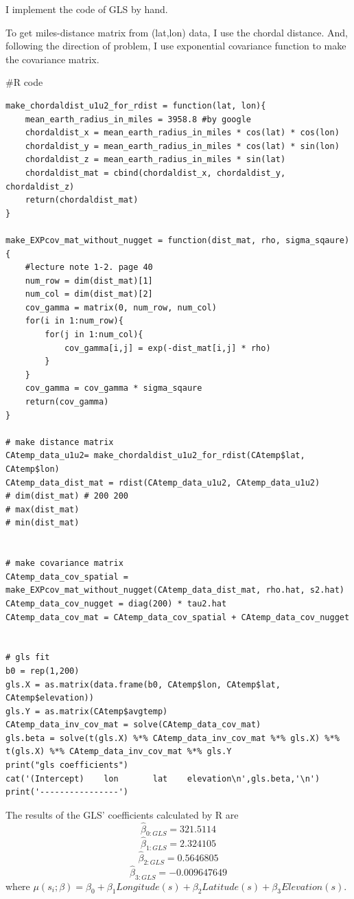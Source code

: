 \documentclass{article}
\newenvironment{Rcode}%
{%
    \begin{mdframed}
    \#R code
    \begin{small}
}
{%
    \end{small}
    \end{mdframed}
}
\begin{document}
I implement the code of GLS by hand. 

To get miles-distance matrix from (lat,lon) data, I use the chordal distance.
And, following the direction of problem, I use exponential covariance function to make the covariance matrix.
\begin{Rcode}
    \begin{verbatim}
make_chordaldist_u1u2_for_rdist = function(lat, lon){
    mean_earth_radius_in_miles = 3958.8 #by google
    chordaldist_x = mean_earth_radius_in_miles * cos(lat) * cos(lon)
    chordaldist_y = mean_earth_radius_in_miles * cos(lat) * sin(lon)
    chordaldist_z = mean_earth_radius_in_miles * sin(lat)
    chordaldist_mat = cbind(chordaldist_x, chordaldist_y, chordaldist_z)
    return(chordaldist_mat)
}
    
make_EXPcov_mat_without_nugget = function(dist_mat, rho, sigma_sqaure){
    #lecture note 1-2. page 40
    num_row = dim(dist_mat)[1] 
    num_col = dim(dist_mat)[2]
    cov_gamma = matrix(0, num_row, num_col)
    for(i in 1:num_row){
        for(j in 1:num_col){
            cov_gamma[i,j] = exp(-dist_mat[i,j] * rho)
        }
    }
    cov_gamma = cov_gamma * sigma_sqaure
    return(cov_gamma)
}
    
# make distance matrix
CAtemp_data_u1u2= make_chordaldist_u1u2_for_rdist(CAtemp$lat, CAtemp$lon)
CAtemp_data_dist_mat = rdist(CAtemp_data_u1u2, CAtemp_data_u1u2)
# dim(dist_mat) # 200 200
# max(dist_mat)
# min(dist_mat)


# make covariance matrix
CAtemp_data_cov_spatial = make_EXPcov_mat_without_nugget(CAtemp_data_dist_mat, rho.hat, s2.hat)
CAtemp_data_cov_nugget = diag(200) * tau2.hat
CAtemp_data_cov_mat = CAtemp_data_cov_spatial + CAtemp_data_cov_nugget


# gls fit
b0 = rep(1,200)
gls.X = as.matrix(data.frame(b0, CAtemp$lon, CAtemp$lat, CAtemp$elevation))
gls.Y = as.matrix(CAtemp$avgtemp)
CAtemp_data_inv_cov_mat = solve(CAtemp_data_cov_mat)
gls.beta = solve(t(gls.X) %*% CAtemp_data_inv_cov_mat %*% gls.X) %*% t(gls.X) %*% CAtemp_data_inv_cov_mat %*% gls.Y
print("gls coefficients")
cat('(Intercept)    lon       lat    elevation\n',gls.beta,'\n')
print('----------------')
    \end{verbatim}
\end{Rcode}

The results of the GLS' coefficients calculated by R are
\[\hat{\beta}_{0:GLS}=321.5114\]
\[\hat{\beta}_{1:GLS}=2.324105\]
\[\hat{\beta}_{2:GLS}=0.5646805\]
\[\hat{\beta}_{3:GLS}=-0.009647649\]
where \(\mu(s_i;\beta)=\beta_0+\beta_1 Longitude(s) + \beta_2 Latitude(s)+\beta_3 Elevation(s)\).
\end{document}
